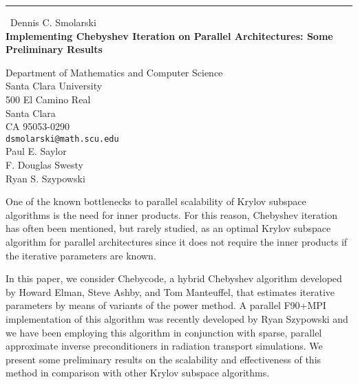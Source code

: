 \documentclass{report}
\begin{document}
\begin{center}
\rule{6in}{1pt} \
{\large Dennis C. Smolarski \\
{\bf Implementing Chebyshev Iteration on Parallel Architectures: Some Preliminary Results}}

Department of Mathematics and Computer Science \\ Santa Clara University \\ 500 El Camino Real \\ Santa Clara \\ CA  95053-0290
\\
{\tt dsmolarski@math.scu.edu}\\
Paul E. Saylor\\
F. Douglas Swesty\\
	Ryan S. Szypowski\end{center}

One of the known bottlenecks to parallel scalability of Krylov
subspace algorithms is the need for inner products. For this
reason, Chebyshev iteration has often been mentioned, but
rarely studied, as an optimal Krylov subspace algorithm for
parallel architectures since it does not require the inner
products if the iterative parameters are known.

In this paper, we consider {\sc Chebycode,} a hybrid Chebyshev
algorithm developed by Howard Elman, Steve Ashby, and Tom
Manteuffel, that estimates iterative parameters by means of
variants of the power method. A parallel F90+MPI implementation of
this algorithm was recently developed by Ryan Szypowski and we
have been employing this algorithm in conjunction with sparse,
parallel approximate inverse preconditioners in radiation
transport simulations. We present some preliminary results on the
scalability and effectiveness of this method in comparison with
other Krylov subspace algorithms.
\end{document}

